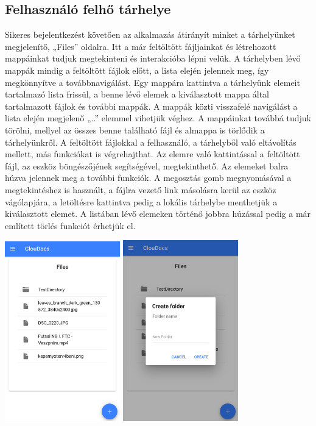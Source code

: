 \documentclass[12pt]{report}
\begin{document}
\subsection{Felhasználó felhő tárhelye}
Sikeres bejelentkezést követően az alkalmazás átirányít minket a tárhelyünket megjelenítő, „Files” oldalra. Itt a már feltöltött fájljainkat és létrehozott mappáinkat tudjuk megtekinteni és interakcióba lépni velük. A tárhelyben lévő mappák mindig a feltöltött fájlok előtt, a lista elején jelennek meg, így megkönnyítve a továbbnavigálást. Egy mappára kattintva a tárhelyünk elemeit tartalmazó lista frissül, a benne lévő elemek a kiválasztott mappa által tartalmazott fájlok és további mappák. A mappák közti visszafelé navigálást a lista elején megjelenő „..” elemmel vihetjük véghez. A mappáinkat továbbá tudjuk törölni, mellyel az összes benne található fájl és almappa is törlődik a tárhelyünkről. A feltöltött fájlokkal a felhasználó, a tárhelyből való eltávolítás mellett, más funkciókat is végrehajthat. Az elemre való kattintással a feltöltött fájl, az eszköz böngészőjének segítségével, megtekinthető. Az elemeket balra húzva jelennek meg a további funkciók. A megosztás gomb megnyomásával a megtekintéshez is használt, a fájlra vezető link másolásra kerül az eszköz vágólapjára, a letöltésre kattintva pedig a lokális tárhelybe menthetjük a kiválasztott elemet. A listában lévő elemeken történő jobbra húzással pedig a már említett törlés funkciót érhetjük el.

\begin{center}
	\includegraphics[width=50mm,scale=0.5,]{files.png}
	\includegraphics[width=50mm,scale=0.5,]{createFolder.png}
\end{center}
\end{document}

